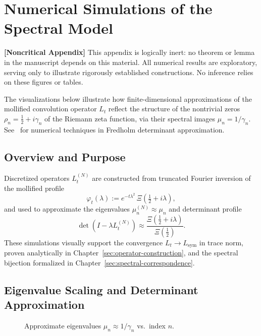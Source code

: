 \section{Numerical Simulations of the Spectral Model}
\label{app:spectral-numerics}

\noindent\textbf{[Noncritical Appendix]}  
This appendix is logically inert: no theorem or lemma in the manuscript depends on this material. All numerical results are exploratory, serving only to illustrate rigorously established constructions. No inference relies on these figures or tables.

\medskip

The visualizations below illustrate how finite-dimensional approximations of the mollified convolution operator \( L_t \) reflect the structure of the nontrivial zeros \( \rho_n = \tfrac{1}{2} + i\gamma_n \) of the Riemann zeta function, via their spectral images \( \mu_n = 1/\gamma_n \). See~\cite{Bornemann2010FredholmDeterminants} for numerical techniques in Fredholm determinant approximation.

\subsection*{Overview and Purpose}

Discretized operators \( L_t^{(N)} \) are constructed from truncated Fourier inversion of the mollified profile
\[
\varphi_t(\lambda) := e^{-t\lambda^2} \, \Xi\left( \tfrac{1}{2} + i\lambda \right),
\]
and used to approximate the eigenvalues \( \mu_n^{(N)} \approx \mu_n \) and determinant profile
\[
\det(I - \lambda L_t^{(N)}) \approx \frac{\Xi(\tfrac{1}{2} + i\lambda)}{\Xi(\tfrac{1}{2})}.
\]
These simulations visually support the convergence \( L_t \to L_{\mathrm{sym}} \) in trace norm, proven analytically in Chapter~\ref{sec:operator-construction}, and the spectral bijection formalized in Chapter~\ref{sec:spectral-correspondence}.

\subsection*{Eigenvalue Scaling and Determinant Approximation}

\begin{figure}[ht]
  \centering
  \caption{Approximate eigenvalues \( \mu_n \approx 1/\gamma_n \) vs.\ index \( n \).}
  \label{fig:mu-vs-index}
\end{figure}

